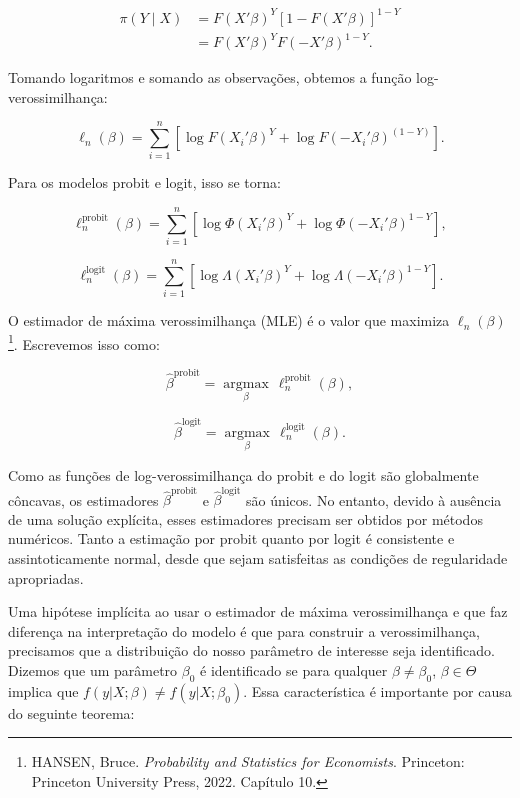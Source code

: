 \documentclass[12pt]{article}
\theoremstyle{break}
\begin{document}
\begin{align*}
    \pi(Y \mid {X}) &= F({X}'{\beta})^{Y} \left[1 - F({X}'{\beta})\right]^{1 - Y} \\
                           &= F({X}'{\beta})^{Y} F(-{X}'{\beta})^{1 - Y}.
\end{align*}

Tomando logaritmos e somando as observações, obtemos a função log-verossimilhança:

\[
\ell_n({\beta}) = \sum_{i=1}^{n} \left[  \log F({X}_i'{\beta})^Y +  \log F(-{X}_i'{\beta})^{(1 - Y)} \right].
\]

Para os modelos probit e logit, isso se torna:

\[
\ell_n^{\text{probit}}({\beta}) = \sum_{i=1}^{n} \left[  \log \Phi({X}_i'{\beta})^Y + \log \Phi(-{X}_i'{\beta})^{1-Y} \right],
\]

\[
\ell_n^{\text{logit}}({\beta}) = \sum_{i=1}^{n} \left[ \log \Lambda({X}_i'{\beta})^Y +  \log \Lambda(-{X}_i'{\beta})^{1-Y} \right].
\]

O estimador de máxima verossimilhança (MLE) é o valor que maximiza \( \ell_n({\beta}) \)\footnote{HANSEN, Bruce. \textit{Probability and Statistics for Economists}. Princeton: Princeton University Press, 2022. Capítulo 10.}. Escrevemos isso como:

\[
\hat{{\beta}}^{\text{probit}} = \underset{{\beta}}{\operatorname{argmax}} \, \ell_n^{\text{probit}}({\beta}),
\]

\[
\hat{{\beta}}^{\text{logit}} = \underset{{\beta}}{\operatorname{argmax}} \, \ell_n^{\text{logit}}({\beta}).
\]

Como as funções de log-verossimilhança do probit e do logit são globalmente côncavas, os estimadores \( \hat{{\beta}}^{\text{probit}} \) e \( \hat{{\beta}}^{\text{logit}} \) são únicos. No entanto, devido à ausência de uma solução explícita, esses estimadores precisam ser obtidos por métodos numéricos. Tanto a estimação por probit quanto por logit é consistente e assintoticamente normal, desde que sejam satisfeitas as condições de regularidade apropriadas.





Uma hipótese implícita ao usar o estimador de máxima verossimilhança e que faz diferença na interpretação do modelo é que para construir a verossimilhança, precisamos que a distribuição do nosso parâmetro de interesse seja identificado. Dizemos que um parâmetro \(\beta_0\) é identificado se para qualquer \(\beta \neq \beta_0\), \(\beta \in \Theta\) implica que \(f(y | X; \beta) \neq f(y | X; \beta_0)\). Essa característica é importante por causa do seguinte teorema:
\end{document}
